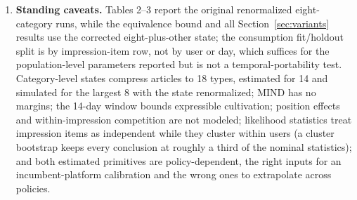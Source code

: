 \documentclass[11pt]{article}
\begin{document}
\begin{enumerate}
{data reject the one testable repair.} Terminal payoffs, distance-based
acceptance, and MNL slates all leave the premium below a quarter percent;
the spillover transition is estimated at $\hat s=\spillshat$. In the
showcase regime the empirically preferred tenure-declining update
eliminates the bridge path outright. And the algorithm benchmark shows
plug-in planning at \idxplugin\% of oracle, so the index heuristic's
contribution must be established against plug-in, not against myopia,
and hinges on disciplining its free potential and cultivation weight.
\item \textbf{Standing caveats.} Tables 2--3 report the original
renormalized eight-category runs, while the equivalence bound and all
Section~\ref{sec:variants} results use the corrected
eight-plus-other state; the consumption fit/holdout split is by
impression-item row, not by user or day, which suffices for the
population-level parameters reported but is not a temporal-portability
test. Category-level states compress articles
to 18 types, estimated for 14 and simulated for the largest 8 with the
state renormalized; MIND has no margins; the 14-day window bounds
expressible cultivation; position effects and within-impression
competition are not modeled; likelihood statistics treat impression items
as independent while they cluster within users (a cluster bootstrap keeps
every conclusion at roughly a third of the nominal statistics); and both
estimated primitives are policy-dependent, the right inputs for an
incumbent-platform calibration and the wrong ones to extrapolate across
policies.
\end{enumerate}
\end{document}
